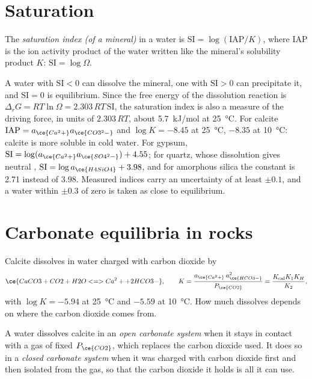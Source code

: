\section{Saturation}\label{sec:b3:water-rock-interaction:saturation}

\begin{definition}\label{def:b3:water-rock-interaction:si}
The \emph{saturation index (of a mineral)}
in a water is $\mathrm{SI} = \log(\mathrm{IAP}/K)$, where IAP is
the ion activity product of the water written like the mineral's solubility
product $K$: $\mathrm{SI} = \log\Omega$.
\end{definition}

A water with $\mathrm{SI} < 0$ can dissolve the mineral, one with
$\mathrm{SI} > 0$ can precipitate it, and $\mathrm{SI} = 0$ is equilibrium.
Since the free energy of the dissolution reaction is $\Delta_r G = RT\ln\Omega
= 2.303\,RT\,\mathrm{SI}$, the saturation index is also a measure of the
driving force, in units of $2.303\,RT$, about \qty{5.7}{kJ/mol} at
\qty{25}{\celsius}. For calcite $\mathrm{IAP} = a_{\ce{Ca^2+}}
a_{\ce{CO3^2-}}$ and $\log K = -8.45$ at \qty{25}{\celsius}, $-8.35$ at
\qty{10}{\celsius}: calcite is more soluble in cold water. For gypsum, $\mathrm{SI} = \log(a_{\ce{Ca^2+}}a_{\ce{SO4^2-}}) + 4.55$;
for quartz, whose dissolution gives neutral , $\mathrm{SI} = \log
a_{\ce{H4SiO4}} + 3.98$, and for amorphous silica the constant is 2.71
instead of 3.98. Measured indices carry an uncertainty of at least $\pm0.1$,
and a water within $\pm0.3$ of zero is taken as close to equilibrium.

\section{Carbonate equilibria in rocks}\label{sec:b3:water-rock-interaction:carbonate}

Calcite dissolves in water charged with carbon dioxide by
\[
\ce{CaCO3 + CO2 + H2O <=> Ca^2+ + 2 HCO3-},
\qquad K = \frac{a_{\ce{Ca^2+}}\,a_{\ce{HCO3-}}^2}{P_{\ce{CO2}}}
= \frac{K_{\mathrm{cal}}K_1K_H}{K_2},
\]
with $\log K = -5.94$ at \qty{25}{\celsius} and $-5.59$ at \qty{10}{\celsius}.
How much dissolves depends on where the carbon dioxide comes from.

\begin{definition}\label{def:b3:water-rock-interaction:open-closed}
A water dissolves calcite in an \emph{open carbonate system}
when it stays in contact with a gas of fixed
$P_{\ce{CO2}}$, which replaces the carbon dioxide used. It does so in a
\emph{closed carbonate system} when it was
charged with carbon dioxide first and then isolated from the gas, so that
the carbon dioxide it holds is all it can use.
\end{definition}

